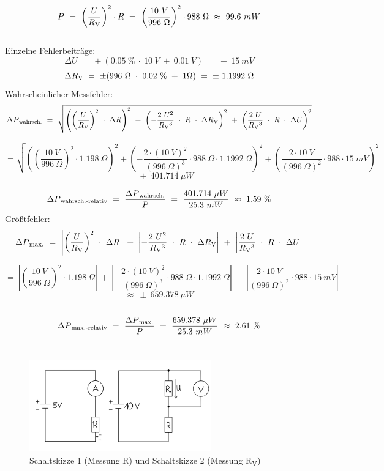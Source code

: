 \documentclass[a4paper,12pt]{article}
\begin{document}
\[
P ~=~  \left(\frac{U}{R\textsubscript{V}}\right)^2 \cdot R ~=~ \left(\frac{10~V}{996~\Omega}\right)^2 \cdot 988~\Omega ~\approx~ 99.6~mW
\]\\

\noindent Einzelne Fehlerbeiträge:
\[
\Delta U~=~\pm(0.05~\%~\cdot~10~V~+~0.01~V)~=~\pm~15~mV
\]
\[
\Delta R\textsubscript{V}~=~\pm(996~\Omega~\cdot~0.02~\%~+~1\Omega)~=~\pm~1.1992~\Omega
\]
Wahrscheinlicher Messfehler:\\
\[
\Delta P\textsubscript{wahrsch.}~=~\sqrt{\left(\left(\frac{U}{R\textsubscript{V}}\right)^2~\cdot~\Delta R\right)^2~+~\left(-\frac{2~U^2}{R\textsubscript{V}^3}~\cdot~R~\cdot~\Delta R\textsubscript{V} \right)^2~+~\left(\frac{2~U}{R\textsubscript{V}^3}~\cdot~R~\cdot~\Delta U\right)^2}
\]

\[
=\sqrt{\left(\left(\frac{10~V}{996~\Omega}\right)^2\cdot1.198~\Omega\right)^2+\left(-\frac{2\cdot(10~V)^2}{(996~\Omega)^3}\cdot988~\Omega\cdot1.1992~\Omega \right)^2+\left(\frac{2\cdot10~V}{(996~\Omega)^2}\cdot988\cdot15~mV\right)^2}
\]
\[
=~\pm~401.714~\mu W
\]

\[
\Delta P\textsubscript{wahrsch.-relativ}~=~\frac{\Delta P\textsubscript{wahrsch.}}{P}~=~\frac{401.714~\mu W}{25.3~mW}~\approx~1.59~\%
\]
Größtfehler:\\
\[
\Delta P\textsubscript{max.}~=~\left\lvert \left(\frac{U}{R\textsubscript{V}}\right)^2~\cdot~\Delta R\right\rvert~+~\left\lvert -\frac{2~U^2}{R\textsubscript{V}^3}~\cdot~R~\cdot~\Delta R\textsubscript{V}\right\rvert~+~\left\lvert \frac{2~U}{R\textsubscript{V}^3}~\cdot~R~\cdot~\Delta U\right\rvert
\]


\[
=~\left\lvert \left(\frac{10~V}{996~\Omega}\right)^2\cdot1.198~\Omega\right\rvert~+~\left\lvert -\frac{2\cdot(10~V)^2}{(996~\Omega)^3}\cdot988~\Omega\cdot1.1992~\Omega\right\rvert~+~\left\lvert\frac{2\cdot10~V}{(996~\Omega)^2}\cdot988\cdot15~mV\right\rvert
\]
\[
\approx~\pm~659.378~\mu W
\]\\
\[
\Delta P\textsubscript{max.-relativ}~=~\frac{\Delta P\textsubscript{max.}}{P}~=~\frac{659.378~\mu W}{25.3~mW}~\approx~2.61~\%
\]\\


\begin{figure}[H]
    \centering
    \includegraphics[width=0.7\textwidth]{../Quellen/Labor2/Schaltskizzen Widerstandsmessung.jpeg}
\caption{Schaltskizze 1 (Messung R) und Schaltskizze 2 (Messung R\textsubscript{V})}
\end{figure}
\end{document}
